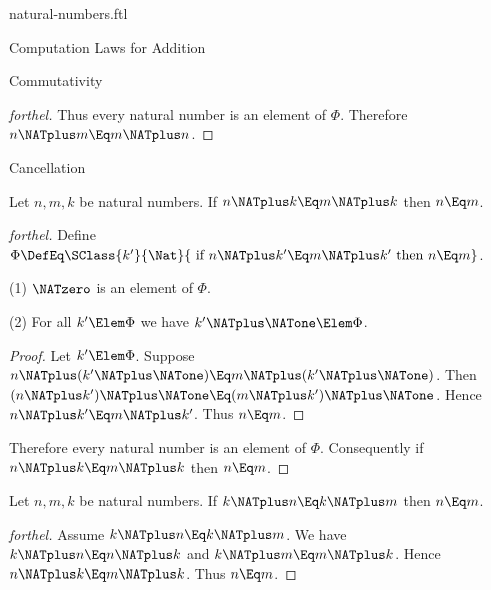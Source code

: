 \documentclass{stex}
\begin{document}
\begin{smodule}{natural-numbers.ftl}
\begin{sfragment}{Computation Laws for Addition}
\begin{sfragment}{Commutativity}
\begin{proof}[forthel]
      Thus every natural number is an element of $\Phi$.
      Therefore $n \NATplus m \Eq m \NATplus n$.
    \end{proof}
  \end{sfragment}

  \begin{sfragment}{Cancellation}
    

    \begin{proposition}[forthel,name=right-cancellability of addition]
      Let $n, m, k$ be natural numbers.
      If $n \NATplus k \Eq m \NATplus k$ then $n \Eq m$.
    \end{proposition}
    \begin{proof}[forthel]
      Define $\Phi \DefEq \SClass{k'}{\Nat}{\text{ if }n \NATplus k' \Eq m \NATplus k'\text{ then }n \Eq m}$.

      (1) $\NATzero$ is an element of $\Phi$.

      (2) For all $k' \Elem \Phi$ we have $k' \NATplus \NATone \Elem \Phi$.
      \begin{proof}
        Let $k' \Elem \Phi$.
        Suppose $n \NATplus (k' \NATplus \NATone) \Eq m \NATplus (k' \NATplus \NATone)$.
        Then $(n \NATplus k') \NATplus \NATone \Eq (m \NATplus k') \NATplus \NATone$.
        Hence $n \NATplus k' \Eq m \NATplus k'$.
        Thus $n \Eq m$.
      \end{proof}

      Therefore every natural number is an element of $\Phi$.
      Consequently if $n \NATplus k \Eq m \NATplus k$ then $n \Eq m$.
    \end{proof}


    \begin{corollary}[forthel,name=left-cancellability of addition]
      Let $n, m, k$ be natural numbers.
      If $k \NATplus n \Eq k \NATplus m$ then $n \Eq m$.
    \end{corollary}
    \begin{proof}[forthel]
      Assume $k \NATplus n \Eq k \NATplus m$.
      We have $k \NATplus n \Eq n \NATplus k$ and $k \NATplus m \Eq m \NATplus k$.
      Hence $n \NATplus k \Eq m \NATplus k$.
      Thus $n \Eq m$.
    \end{proof}
  \end{sfragment}


\end{sfragment}
\end{smodule}
\end{document}
